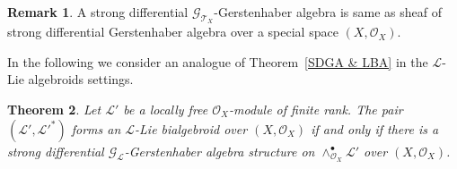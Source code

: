 \documentclass[pdftex]{sigma}
\numberwithin{equation}{section}
\newtheorem{Thm}{Theorem}[section]
\theoremstyle{definition}
\newtheorem{Rem}[Thm]{Remark}
\begin{document}
\begin{Rem}
	A strong differential $\mathcal{G}_{\mathcal{T}_X}$-Gerstenhaber algebra is same as sheaf of strong differential Gerstenhaber algebra over a special space $(X, \mathcal{O}_X)$.	
\end{Rem}
In the following we consider an analogue of Theorem~\ref{SDGA & LBA} in the $\mathcal{L}$-Lie algebroids settings.
\begin{Thm} \label{L-version of Lie bialg & strong G alg}
Let $\mathcal{L}'$ be a locally free $\mathcal{O}_X$-module of finite rank. The pair $(\mathcal{L}', \mathcal{L}'^*)$ forms an $\mathcal{L}$-Lie bialgebroid over $(X,\mathcal{O}_X)$ if and only if there is a strong differential $\mathcal{G}_{\mathcal{L}}$-Gerstenhaber algebra structure on $\wedge^\bullet_{\mathcal{O}_X} \mathcal{L}'$ over $(X,\mathcal{O}_X)$.
\end{Thm}
\end{document}
